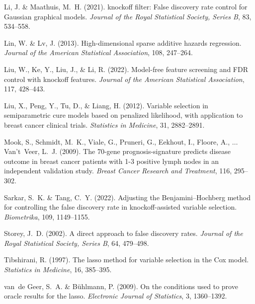 \documentclass[11pt]{article}
\begin{document}
\begin{thebibliography}{}
	Li, J. \& Maathuis, M.~H. (2021).
	 knockoff filter: False discovery rate control for {Gaussian}
	graphical models.
	\newblock \textit{Journal of the Royal Statistical Society, Series B},
	83, 534--558.
	
	Lin, W. \& Lv, J. (2013).
	\newblock High-dimensional sparse additive hazards regression.
	\newblock \textit{Journal of the American Statistical Association}, 108, 247--264.
	
	
	Liu, W., Ke, Y., Liu, J., \& Li, R. (2022).
	\newblock Model-free feature screening and {FDR} control with knockoff features.
	\newblock \textit{Journal of the American Statistical Association}, 117, 428--443.
	
	Liu, X., Peng, Y., Tu, D., \& Liang, H. (2012).
	\newblock Variable selection in semiparametric cure models based on penalized
	likelihood, with application to breast cancer clinical trials.
	\newblock \textit{Statistics in Medicine}, 31, 2882--2891.
	
	Mook, S., Schmidt, M.~K., Viale, G., Pruneri, G., Eekhout, I., Floore, A., $\ldots$ Van't~Veer, L.~J.
	(2009).
	\newblock The 70-gene prognosis-signature predicts disease outcome in breast
	cancer patients with 1-3 positive lymph nodes in an independent validation
	study.
	\newblock \textit{Breast Cancer Research and Treatment}, 116, 295--302.
	
	Sarkar, S.~K. \& Tang, C.~Y. (2022).
	\newblock Adjusting the {Benjamini--Hochberg} method for controlling the false
	discovery rate in knockoff-assisted variable selection.
	\newblock \textit{Biometrika}, 109, 1149--1155.
	
	Storey, J.~D. (2002).
	\newblock A direct approach to false discovery rates.
	\newblock \textit{Journal of the Royal Statistical Society, Series B},
	64, 479--498.
	
	Tibshirani, R. (1997).
	\newblock The lasso method for variable selection in the {Cox} model.
	\newblock \textit{Statistics in Medicine}, 16, 385--395.
	
	van~de Geer, S.~A. \& B{\"u}hlmann, P. (2009).
	\newblock On the conditions used to prove oracle results for the lasso.
	\newblock \textit{Electronic Journal of Statistics}, 3, 1360--1392.
	

\end{thebibliography}
\end{document}
